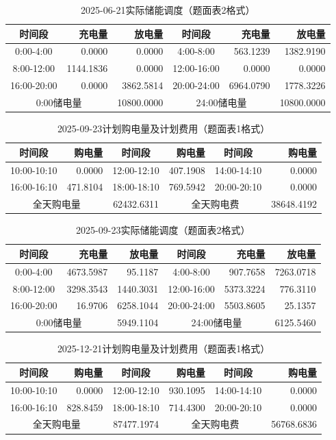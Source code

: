\begin{table}[htbp]\centering
\caption{2025-06-21实际储能调度（题面表2格式）}
\begin{tabular}{|c|r|r|c|r|r|}\hline
时间段 & 充电量 & 放电量 & 时间段 & 充电量 & 放电量 \\\hline
0:00-4:00 & 0.0000 & 0.0000 & 4:00-8:00 & 563.1239 & 1382.9190 \\\hline
8:00-12:00 & 1144.1836 & 0.0000 & 12:00-16:00 & 0.0000 & 0.0000 \\\hline
16:00-20:00 & 0.0000 & 3862.5814 & 20:00-24:00 & 6964.0790 & 1778.3226 \\\hline
\multicolumn{2}{|c|}{0:00储电量} & 10800.0000 & \multicolumn{2}{c|}{24:00储电量} & 10800.0000 \\\hline
\end{tabular}\end{table}
\begin{table}[htbp]\centering
\caption{2025-09-23计划购电量及计划费用（题面表1格式）}
\begin{tabular}{|c|r|c|r|c|r|}\hline
时间段 & 购电量 & 时间段 & 购电量 & 时间段 & 购电量 \\\hline
10:00-10:10 & 0.0000 & 12:00-12:10 & 407.1908 & 14:00-14:10 & 0.0000 \\\hline
16:00-16:10 & 471.8104 & 18:00-18:10 & 769.5942 & 20:00-20:10 & 0.0000 \\\hline
\multicolumn{2}{|c|}{全天购电量} & 62432.6311 & \multicolumn{2}{c|}{全天购电费} & 38648.4192 \\\hline
\end{tabular}\end{table}
\begin{table}[htbp]\centering
\caption{2025-09-23实际储能调度（题面表2格式）}
\begin{tabular}{|c|r|r|c|r|r|}\hline
时间段 & 充电量 & 放电量 & 时间段 & 充电量 & 放电量 \\\hline
0:00-4:00 & 4673.5987 & 95.1187 & 4:00-8:00 & 907.7658 & 7263.0718 \\\hline
8:00-12:00 & 3298.3543 & 1440.3031 & 12:00-16:00 & 5373.3224 & 776.3110 \\\hline
16:00-20:00 & 16.9706 & 6258.1044 & 20:00-24:00 & 5503.8605 & 25.1357 \\\hline
\multicolumn{2}{|c|}{0:00储电量} & 5949.1104 & \multicolumn{2}{c|}{24:00储电量} & 6125.5460 \\\hline
\end{tabular}\end{table}
\begin{table}[htbp]\centering
\caption{2025-12-21计划购电量及计划费用（题面表1格式）}
\begin{tabular}{|c|r|c|r|c|r|}\hline
时间段 & 购电量 & 时间段 & 购电量 & 时间段 & 购电量 \\\hline
10:00-10:10 & 0.0000 & 12:00-12:10 & 930.1095 & 14:00-14:10 & 0.0000 \\\hline
16:00-16:10 & 828.8459 & 18:00-18:10 & 714.4300 & 20:00-20:10 & 0.0000 \\\hline
\multicolumn{2}{|c|}{全天购电量} & 87477.1974 & \multicolumn{2}{c|}{全天购电费} & 56768.6836 \\\hline
\end{tabular}\end{table}
